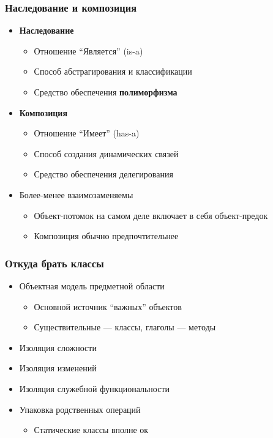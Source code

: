 \documentclass[xetex,mathserif,serif]{beamer}
\begin{document}
    \begin{frame}
        \frametitle{Наследование и композиция}
        \begin{itemize}
            \item \textbf{Наследование}
            \begin{itemize}
                \item Отношение ``Является'' (is-a)
                \item Способ абстрагирования и классификации
                \item Средство обеспечения \textbf{полиморфизма}
            \end{itemize}
            \item \textbf{Композиция}
            \begin{itemize}
                \item Отношение ``Имеет'' (has-a)
                \item Способ создания динамических связей
                \item Средство обеспечения делегирования
            \end{itemize}
            \item Более-менее взаимозаменяемы
            \begin{itemize}
                \item Объект-потомок на самом деле включает в себя объект-предок
                \item Композиция обычно предпочтительнее
            \end{itemize}
        \end{itemize}
    \end{frame}

    \begin{frame}
        \frametitle{Откуда брать классы}
        \begin{itemize}
            \item Объектная модель предметной области
            \begin{itemize}
                \item Основной источник ``важных'' объектов
                \item Существительные --- классы, глаголы --- методы
            \end{itemize}
            \item Изоляция сложности
            \item Изоляция изменений
            \item Изоляция служебной функциональности
            \item Упаковка родственных операций
            \begin{itemize}
                \item Статические классы вполне ок
            \end{itemize}
        \end{itemize}
    \end{frame}
\end{document}
